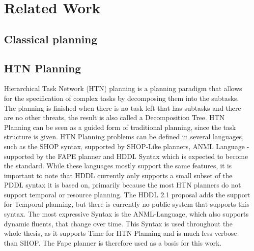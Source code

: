 \section{Related Work}\label{sec:related-work}

\subsection{Classical planning}\label{sec:classical-planning}


\subsection{HTN Planning}\label{sec:htn-planning}

Hierarchical Task Network (HTN) planning is a planning paradigm that allows for the specification of complex tasks by decomposing them into the subtasks.
The planning is finished when there is no task left that has subtasks and there are no other threats, the result is also called a Decomposition Tree.
HTN Planning can be seen as a guided form of traditional planning, since the task structure is given.
HTN Planning problems can be defined in several languages, such as the SHOP syntax, supported by SHOP-Like planners, ANML Language - supported by the FAPE planner and HDDL Syntax which is expected to become the standard.
While these languages mostly support the same features, it is important to note that HDDL currently only supports a small subset of the PDDL syntax it is based on, primarily because the most HTN planners do not support temporal or resource planning.
The HDDL 2.1 proposal adds the support for Temporal planning, but there is currently no public system that supports this syntax.
The most expressive Syntax is the ANML-Language, which also supports dynamic fluents, that change over time.
This Syntax is used throughout the whole thesis, as it supports Time for HTN Planning and is much less verbose than SHOP.
The Fape planner is therefore used as a basis for this work.


